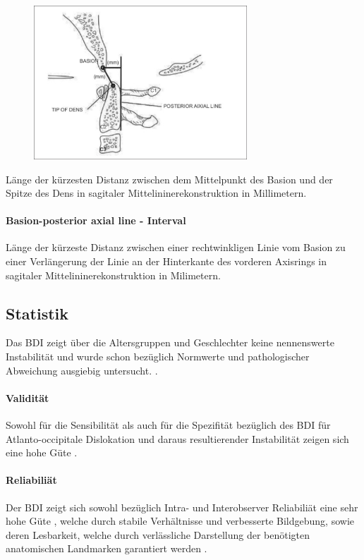 \documentclass{report}
\begin{document}
\begin{figure}[h]
        \includegraphics[width=8cm]{BDI.png}
\end{figure}

Länge der kürzesten Distanz zwischen dem Mittelpunkt des Basion und der Spitze des Dens in sagitaler Mittelininerekonstruktion in Millimetern.


\paragraph{Basion-posterior axial line - Interval}
Länge der kürzeste Distanz zwischen einer rechtwinkligen Linie vom Basion zu einer Verlängerung der Linie an der Hinterkante des vorderen Axisrings in sagitaler Mittelininerekonstruktion in Milimetern.

\subsection{Statistik}
Das BDI zeigt über die Altersgruppen und Geschlechter keine nennenswerte Instabilität \cite{Chaput2011} und wurde schon bezüglich Normwerte und pathologischer Abweichung ausgiebig untersucht.
\cite{Radcliff2010,Radcliff2012,Chang2009,Harris1994,Harris1994a,Chaput2011,Rojas2007,Gonzalez2004,Gonzalez2004a,Dziurzynski2005,Bono2007}. 



\paragraph{Validität}
Sowohl für die Sensibilität als auch für die Spezifität bezüglich des BDI für Atlanto-occipitale Dislokation und daraus resultierender Instabilität zeigen sich eine hohe Güte \cite{Dziurzynski2005}.

\paragraph{Reliabiliät}
Der BDI zeigt sich sowohl bezüglich Intra- und Interobserver Reliabiliät eine sehr hohe Güte \cite{Chaput2011,Dziurzynski2005,Harris1994,Harris1994a}, welche durch stabile Verhältnisse und verbesserte Bildgebung, sowie deren Lesbarkeit, welche durch verlässliche Darstellung der benötigten anatomischen Landmarken garantiert werden \cite{Dziurzynski2005,Radcliff2010}.
\end{document}
